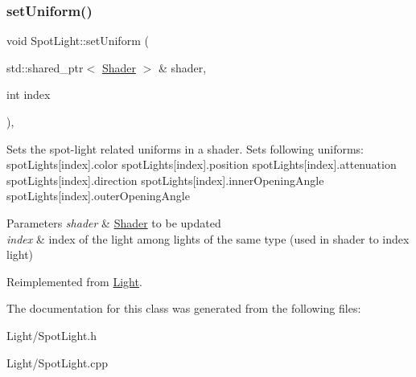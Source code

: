 \subsubsection{\texorpdfstring{setUniform()}{setUniform()}}
{\footnotesize\ttfamily void Spot\+Light\+::set\+Uniform (\begin{DoxyParamCaption}\item[{std\+::shared\+\_\+ptr$<$ \mbox{\hyperlink{class_shader}{Shader}} $>$ \&}]{shader,  }\item[{int}]{index }\end{DoxyParamCaption})\hspace{0.3cm}{\ttfamily [protected]}, {\ttfamily [virtual]}}

Sets the spot-\/light related uniforms in a shader. Sets following uniforms\+: spot\+Lights\mbox{[}index\mbox{]}.color spot\+Lights\mbox{[}index\mbox{]}.position spot\+Lights\mbox{[}index\mbox{]}.attenuation spot\+Lights\mbox{[}index\mbox{]}.direction spot\+Lights\mbox{[}index\mbox{]}.inner\+Opening\+Angle spot\+Lights\mbox{[}index\mbox{]}.outer\+Opening\+Angle 
\begin{DoxyParams}{Parameters}
{\em shader} & \mbox{\hyperlink{class_shader}{Shader}} to be updated \\
\hline
{\em index} & index of the light among lights of the same type (used in shader to index light) \\
\hline
\end{DoxyParams}


Reimplemented from \mbox{\hyperlink{class_light_a05d202e42ffec4c8bece9c18b4d4541e}{Light}}.



The documentation for this class was generated from the following files\+:\begin{DoxyCompactItemize}
\item 
Light/Spot\+Light.\+h\item 
Light/Spot\+Light.\+cpp\end{DoxyCompactItemize}
